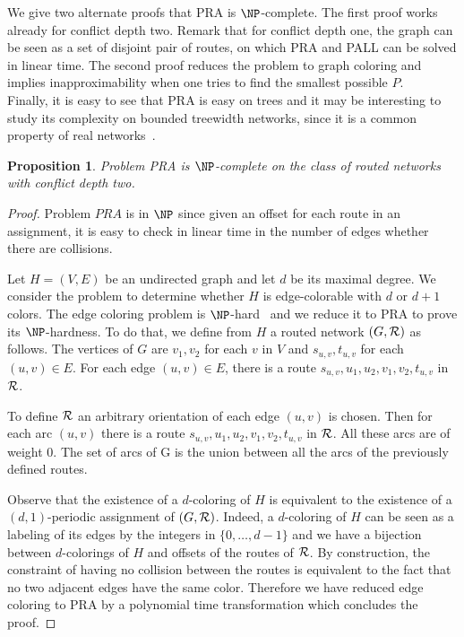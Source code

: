 \documentclass[a4paper,10pt]{article}
\newtheorem{proposition}{Proposition}
\begin{document}
{We give two alternate proofs that PRA is $\NP$-complete.
The first proof works already for conflict depth two. Remark that for conflict depth one,
the graph can be seen as a set of disjoint pair of routes, on which PRA and PALL can be solved in linear time. 
 The second proof reduces the problem to graph coloring and implies inapproximability when one tries to find the smallest possible $P$. \\
 Finally, it is easy to see that PRA is easy on trees and it may be interesting to study its complexity on 
 bounded treewidth networks, since it is a common property of real networks~\cite{de2011treewidth}.
 

 \begin{proposition}
Problem PRA is $\NP$-complete on the class of routed networks with conflict depth two.
\end{proposition}
 \begin{proof}
 Problem $PRA$ is in $\NP$ since given an offset for each route in an assignment, it is easy to check in linear time in the number of edges whether there are collisions.
 
  Let $H=(V,E)$ be an undirected graph and let $d$ be its maximal degree. We consider the problem to determine whether $H$ is edge-colorable
  with $d$ or $d+1$ colors. The edge coloring problem is $\NP$-hard~\cite{holyer1981np} and we reduce it to PRA to prove its $\NP$-hardness. To do that, we define from $H$ a routed network $(G,{\cal R})$ as follows.
  The vertices of $G$ are $v_1, v_2$ for each $v$ in $V$ and $s_{u,v}, t_{u,v}$ for each $(u,v) \in E$.
  For each edge $(u,v) \in E$, there is a route $s_{u,v},u_1,u_2,v_1,v_2,t_{u,v}$ in ${\cal R}$. 
  
   To define ${\cal R}$ an arbitrary orientation of each edge $(u,v)$ is chosen. 
   Then for each arc $(u,v)$ there is a route $s_{u,v},u_1,u_2,v_1,v_2,t_{u,v}$ in ${\cal R}$.
  All these arcs are of weight $0$. The set of arcs of G is the union between all the arcs of the previously defined routes.
   
    
  Observe that the existence of a $d$-coloring of $H$ is equivalent to the existence of a $(d,1)$-periodic assignment
  of $(G,{\cal R})$. Indeed, a $d$-coloring of $H$ can be seen as a labeling of its edges by the integers
  in $\{0,\dots,d-1\}$ and we have a bijection between $d$-colorings of $H$ and offsets of the routes of ${\cal R}$.
  By construction, the constraint of having no collision between the routes is equivalent to the fact that no two adjacent edges have the same color. Therefore we have reduced edge coloring to PRA by a polynomial time transformation which concludes the proof. 
 \end{proof}
 
}
\end{document}
